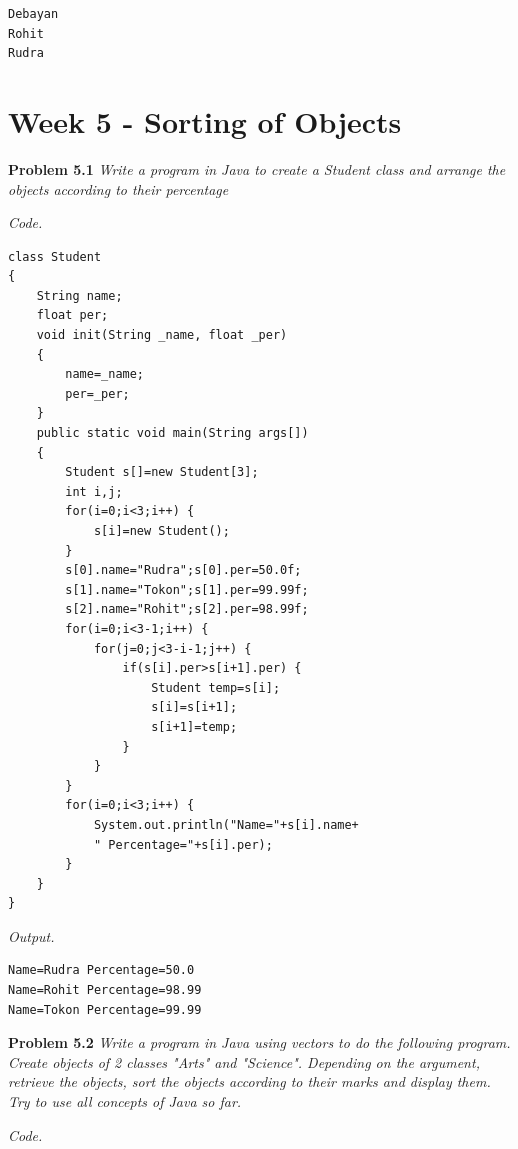 \documentclass[12pt]{article}
\begin{document}
\begin{lstlisting}
Debayan
Rohit
Rudra
\end{lstlisting}

\newpage

\setlength{\fboxrule}{.5mm}\setlength{\fboxsep}{1.2mm}
\addtolength{\boxlength}{-4mm}
\begin{center}\end{center}
\vspace{5mm}

\section{Week 5 - Sorting of Objects}

\textbf{Problem 5.1} \textit{Write a program in Java to create a Student class and arrange the objects according to their percentage}


\textit{Code.}

\begin{lstlisting}
class Student
{
	String name;
	float per;
	void init(String _name, float _per)
	{
		name=_name;
		per=_per;
	}
	public static void main(String args[])
	{
		Student s[]=new Student[3];
		int i,j;
		for(i=0;i<3;i++) {
			s[i]=new Student();
		}
		s[0].name="Rudra";s[0].per=50.0f;
		s[1].name="Tokon";s[1].per=99.99f;
		s[2].name="Rohit";s[2].per=98.99f;
		for(i=0;i<3-1;i++) {
			for(j=0;j<3-i-1;j++) {
				if(s[i].per>s[i+1].per) {
					Student temp=s[i];
					s[i]=s[i+1];
					s[i+1]=temp;
				}
			}
		}
		for(i=0;i<3;i++) {
			System.out.println("Name="+s[i].name+
			" Percentage="+s[i].per);
		}
	}
}
\end{lstlisting}
\textit{Output.}
\begin{lstlisting}
Name=Rudra Percentage=50.0
Name=Rohit Percentage=98.99
Name=Tokon Percentage=99.99
\end{lstlisting}

\textbf{Problem 5.2} \textit{Write a program in Java using vectors to do the following program. Create objects of 2 classes "Arts" and "Science". Depending on the argument, retrieve the objects, sort the objects according to their marks and display them. Try to use all concepts of Java so far.}


\textit{Code.}
\end{document}
